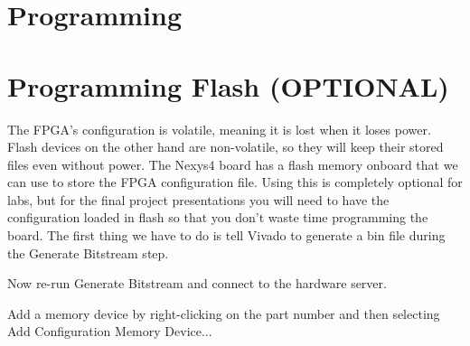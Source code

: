 \section{Programming}
\label{sec:programming}

\section{Programming Flash (OPTIONAL)}
The FPGA's configuration is volatile, meaning it is lost when it loses power.
Flash devices on the other hand are non-volatile, so they will keep their stored files even
without power.
The Nexys4 board has a flash memory onboard that we can use to store the FPGA configuration file.
Using this is completely optional for labs, but for the final project presentations you will need
to have the configuration loaded in flash so that you don't waste time programming the board.
The first thing we have to do is tell Vivado to generate a bin file during the Generate
Bitstream step.


Now re-run Generate Bitstream and connect to the hardware server.


Add a memory device by right-clicking on the part number and then selecting Add Configuration
Memory Device...